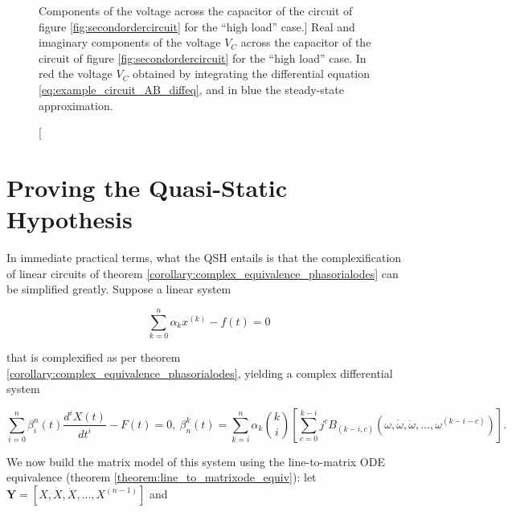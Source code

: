 \begin{example}
\begin{figure}
\begin{center}
\begin{tikzpicture}
                \end{tikzpicture}
        \endpgfgraphicnamed
        \caption
[Components of the voltage across the capacitor of the circuit of figure \ref{fig:secondordercircuit} for the ``high load'' case.]
{Real and imaginary components of the voltage $V_C$ across the capacitor of the circuit of figure \ref{fig:secondordercircuit} for the ``high load'' case. In red the voltage $V_C$ obtained by integrating the differential equation \eqref{eq:example_circuit_AB_diffeq}, and in blue the steady-state approximation.}
        \label{fig:voltage_signals_highload}
        \end{center}
\end{figure}

\examplebar
\end{example}

\section{Proving the Quasi-Static Hypothesis}\label{sec:qsh_proof} %

	In immediate practical terms, what the QSH entails is that the complexification of linear circuits of theorem \ref{corollary:complex_equivalence_phasorialodes} can be simplified greatly. Suppose a linear system 

\begin{equation} \sum_{k=0}^n \alpha_k x^{(k)} - f(t)  = 0 \end{equation} 

	\noindent that is complexified as per theorem \ref{corollary:complex_equivalence_phasorialodes}, yielding a complex differential system

\begin{equation} \sum\limits_{i=0}^n \beta^n_i(t) \dfrac{d^iX(t)}{dt^i} - F(t) = 0,\ \beta_n^k(t) = \sum\limits_{k=i}^{n} \alpha_k{k\choose i}\left[ \sum\limits_{c=0}^{k-i} j^c B_{\left(k-i,c\right)}\left(\omega,\dot{\omega},\ddot{\omega},...,\omega^{(k-i-c)}\right)\right] . \label{eq:qsh_approx_line}\end{equation}

	We now build the matrix model of this system using the line-to-matrix ODE equivalence (theorem \ref{theorem:line_to_matrixode_equiv}): let $\mathbf{Y} = \left[X,\dot{X},\ddot{X},...,X^{(n-1)}\right]$ and

